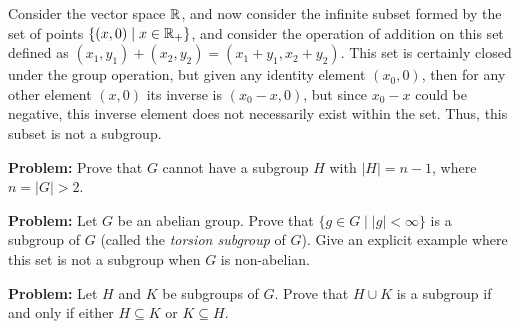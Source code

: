 \documentclass[10pt]{article}
\newenvironment{problem}{\textbf{Problem:}}{}
\begin{document}
	\begin{solution}
		Consider the vector space \( \mathbb R \), and now consider the infinite subset formed by the set of points 
		\( \{(x, 0) \mid x \in \mathbb R_+\}  \), and consider the operation of addition on this set defined as 
		\( (x_1, y_1) + (x_2, y_2) = (x_1 + y_1, x_2 + y_2) \). This set is certainly closed under the group 
		operation, but given any identity element \( (x_0, 0) \), then for any other element \( (x, 0) \) its 
		inverse is \( (x_0 - x, 0) \), but since \( x_0 - x \) could be negative, this inverse element does not 
		necessarily exist within the set. Thus, this subset is not a subgroup. 
	\end{solution}

	\begin{problem}
		Prove that \( G \) cannot have a subgroup \( H \) with \( |H| = n - 1 \), where \( n = |G| > 2 \). 
	\end{problem}

	\begin{problem}
		Let \( G \) be an abelian group. Prove that \( \{g \in G \mid |g| < \infty\}  \) is a subgroup of \( G \) 
		(called the \textit{torsion subgroup} of \( G \)). 
		Give an explicit example where this set is not a subgroup when 
		\( G \) is non-abelian.
	\end{problem}

	\begin{problem}
		Let \( H \) and \( K \) be subgroups of \( G \). Prove that \( H \cup K \) is a subgroup if and only if 
		either \( H \subseteq K \) or \( K \subseteq H \). 
	\end{problem}
\end{document}
